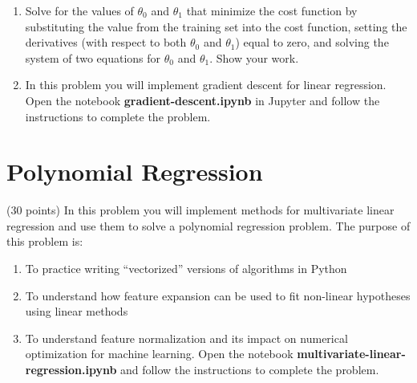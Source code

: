 \documentclass{article}
\begin{document}
\begin{enumerate}
\item Solve for the values of $\theta_0$ and $\theta_1$ that minimize the cost function by substituting the value from the training set into the cost function, setting the derivatives (with respect to both $\theta_0$ and $\theta_1$) equal to zero, and solving  the system of two equations for $\theta_0$ and $\theta_1$. Show your work. 



\item In this problem you will implement gradient descent for linear regression. Open the notebook {\bf gradient-descent.ipynb} in Jupyter and follow the instructions to complete the problem.



\end{enumerate}


\section{Polynomial Regression}

(30 points) In this problem you will implement methods for multivariate linear regression and use them to solve a polynomial regression problem. The purpose of this problem is:

\begin{enumerate}
\item  To practice writing “vectorized” versions of algorithms in Python

\item  To understand how feature expansion can be used to fit non-linear hypotheses using linear methods

\item  To understand feature normalization and its impact on numerical optimization for machine learning. Open the notebook {\bf multivariate-linear-regression.ipynb} and follow the instructions to complete the problem.
\end{enumerate}
\end{document}
